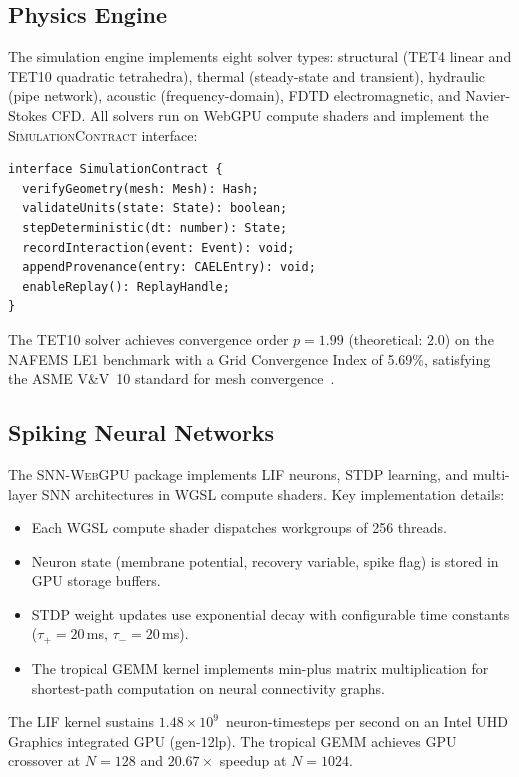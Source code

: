\documentclass[sigchi-a]{acmart}
\newcommand{\simcontract}{\textsc{SimulationContract}}
\newcommand{\snnwebgpu}{\textsc{SNN-WebGPU}}
\begin{document}
\subsection{Physics Engine}

The simulation engine implements eight solver types: structural (TET4 linear
and TET10 quadratic tetrahedra), thermal (steady-state and transient),
hydraulic (pipe network), acoustic (frequency-domain), FDTD electromagnetic,
and Navier-Stokes CFD. All solvers run on WebGPU compute shaders and
implement the \simcontract{} interface:

\begin{lstlisting}[caption={SimulationContract interface (simplified).}]
interface SimulationContract {
  verifyGeometry(mesh: Mesh): Hash;
  validateUnits(state: State): boolean;
  stepDeterministic(dt: number): State;
  recordInteraction(event: Event): void;
  appendProvenance(entry: CAELEntry): void;
  enableReplay(): ReplayHandle;
}
\end{lstlisting}

The TET10 solver achieves convergence order $p = 1.99$ (theoretical: 2.0)
on the NAFEMS LE1 benchmark with a Grid Convergence Index of 5.69\%,
satisfying the ASME V\&V~10 standard for mesh convergence~\cite{asme-vv10}.

\subsection{Spiking Neural Networks}

The \snnwebgpu{} package implements LIF neurons, STDP learning, and
multi-layer SNN architectures in WGSL compute shaders. Key implementation
details:

\begin{itemize}
  \item Each WGSL compute shader dispatches workgroups of 256 threads.
  \item Neuron state (membrane potential, recovery variable, spike flag) is
    stored in GPU storage buffers.
  \item STDP weight updates use exponential decay with configurable
    time constants ($\tau_+ = 20$\,ms, $\tau_- = 20$\,ms).
  \item The tropical GEMM kernel implements min-plus matrix multiplication
    for shortest-path computation on neural connectivity graphs.
\end{itemize}

The LIF kernel sustains $1.48 \times 10^9$~neuron-timesteps per second on an
Intel UHD Graphics integrated GPU (gen-12lp). The tropical GEMM achieves
GPU crossover at $N{=}128$ and $20.67\times$ speedup at $N{=}1024$.
\end{document}
